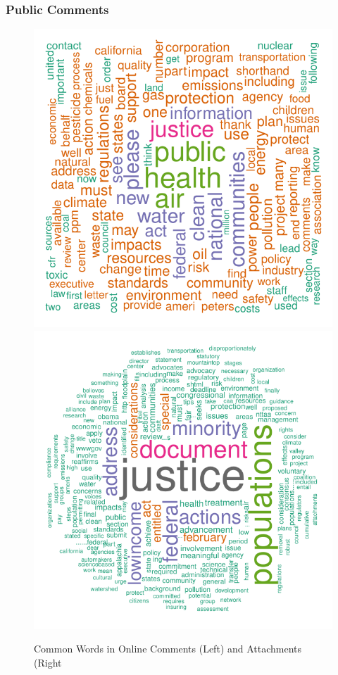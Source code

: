 \documentclass[10pt]{beamer}
\begin{document}
\begin{frame}
\frametitle{Public Comments}
\begin{figure}
\caption{Common Words in Online Comments (Left) and Attachments (Right}
\includegraphics[width = \textwidth/2]{ej_wordcloud_comments.pdf}
\includegraphics[width = \textwidth/2]{ej_wordcloud_attachments.pdf}
\end{figure}
\end{frame}
\end{document}
